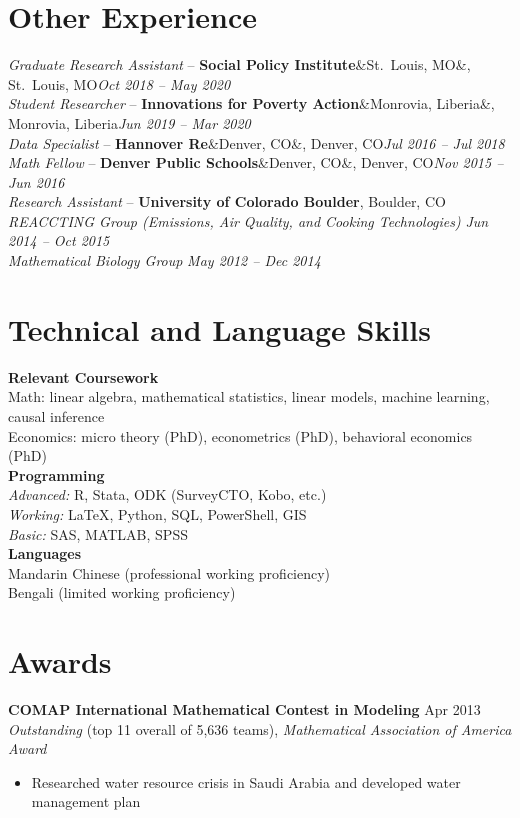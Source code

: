 \documentclass[11pt, letterpaper]{article}
\newcommand{\entry}[4]{%
  \noindent\textit{#1} -- \textbf{#2}\ifx&#3&\else, #3\fi \hfill \textit{#4}\\[2pt]
}
\newcommand{\subentry}[2]{%
  \hspace{1.5em}\textit{#1} \hfill \textit{#2}\\[2pt]
}
\begin{document}
\section{Other Experience}

\entry{Graduate Research Assistant}{Social Policy Institute}{St.\ Louis, MO}{Oct 2018 -- May 2020}
\entry{Student Researcher}{Innovations for Poverty Action}{Monrovia, Liberia}{Jun 2019 -- Mar 2020}
\entry{Data Specialist}{Hannover Re}{Denver, CO}{Jul 2016 -- Jul 2018}
\entry{Math Fellow}{Denver Public Schools}{Denver, CO}{Nov 2015 -- Jun 2016}

\noindent\textit{Research Assistant} -- \textbf{University of Colorado Boulder}, Boulder, CO\\[2pt]
\subentry{REACCTING Group (Emissions, Air Quality, and Cooking Technologies)}{Jun 2014 -- Oct 2015}
\subentry{Mathematical Biology Group}{May 2012 -- Dec 2014}

\section{Technical and Language Skills}

\noindent\textbf{Relevant Coursework}\\[2pt]
\noindent Math: linear algebra, mathematical statistics, linear models, machine learning, causal inference\\
Economics: micro theory (PhD), econometrics (PhD), behavioral economics (PhD)\\[6pt]

\noindent\textbf{Programming}\\[2pt]
\noindent \textit{Advanced:} R, Stata, ODK (SurveyCTO, Kobo, etc.)\\
\textit{Working:} \LaTeX, Python, SQL, PowerShell, GIS\\
\textit{Basic:} SAS, MATLAB, SPSS\\[6pt]

\noindent\textbf{Languages}\\[2pt]
\noindent Mandarin Chinese (professional working proficiency)\\
Bengali (limited working proficiency)

\section{Awards}

\noindent\textbf{COMAP International Mathematical Contest in Modeling} \hfill Apr 2013\\
\textit{Outstanding} (top 11 overall of 5,636 teams), \textit{Mathematical Association of America Award}
\begin{itemize}
  \item Researched water resource crisis in Saudi Arabia and developed water management plan
\end{itemize}
\end{document}
